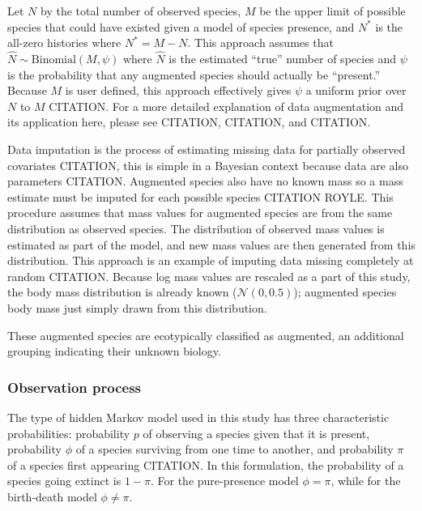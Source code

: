 \documentclass[12pt,letterpaper]{article}
\begin{document}
Let \(N\) by the total number of observed species, \(M\) be the upper limit of possible species that could have existed given a model of species presence, and \(N^{\ast}\) is the all-zero histories where \(N^{\ast} = M - N\). This approach assumes that \(\hat{N} \sim \text{Binomial}(M, \psi)\) where \(\hat{N}\) is the estimated ``true'' number of species and \(\psi\) is the probability that any augmented species should actually be ``present.'' Because \(M\) is user defined, this approach effectively gives \(\psi\) a uniform prior over \(N\) to \(M\) CITATION. For a more detailed explanation of data augmentation and its application here, please see CITATION, CITATION, and CITATION.

Data imputation is the process of estimating missing data for partially observed covariates CITATION, this is simple in a Bayesian context because data are also parameters CITATION. Augmented species also have no known mass so a mass estimate must be imputed for each possible species CITATION ROYLE. This procedure assumes that mass values for augmented species are from the same distribution as observed species. The distribution of observed mass values is estimated as part of the model, and new mass values are then generated from this distribution. This approach is an example of imputing data missing completely at random CITATION. Because log mass values are rescaled as a part of this study, the body mass distribution is already known (\(\mathcal{N}(0, 0.5)\)); augmented species body mass just simply drawn from this distribution. 

These augmented species are ecotypically classified as augmented, an additional grouping indicating their unknown biology. 







\subsubsection*{Observation process}
The type of hidden Markov model used in this study has three characteristic probabilities: probability \(p\) of observing a species given that it is present, probability \(\phi\) of a species surviving from one time to another, and probability \(\pi\) of a species first appearing CITATION. In this formulation, the probability of a species going extinct is \(1 - \pi\). For the pure-presence model \(\phi = \pi\), while for the birth-death model \(\phi \neq \pi\).
\end{document}

